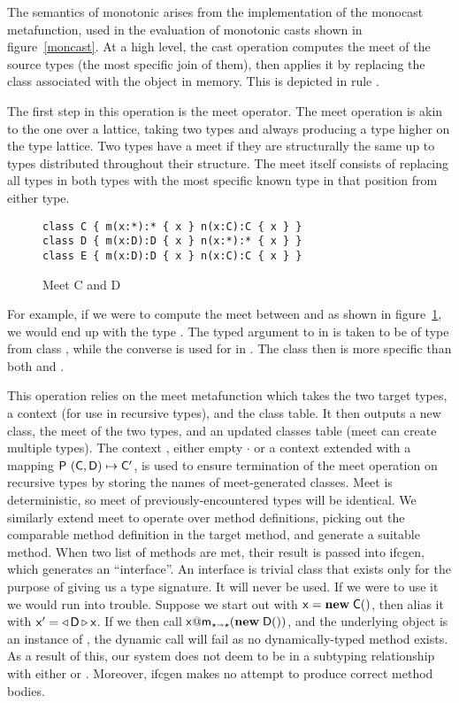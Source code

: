 \documentclass[sigconf]{acmart}
\begin{document}
The semantics of monotonic arises from the implementation of the monocast
metafunction, used in the evaluation of monotonic casts shown in
figure~\ref{moncast}. At a high level, the cast operation computes the
meet of the source types (the most specific join of them), then applies it
by replacing the class associated with the object in memory. This is depicted
in rule .

The first step in this operation is the meet operator. The meet operation is
akin to the one over a lattice, taking two types and always producing a type
higher on the type lattice. Two types have a meet if they are structurally
the same up to \any types distributed throughout their structure. The meet
itself consists of replacing all \any types in both types with the most
specific known type in that position from either type.

\begin{figure}[h]
\begin{lstlisting}
class C { m(x:*):* { x } n(x:C):C { x } }
class D { m(x:D):D { x } n(x:*):* { x } }
class E { m(x:D):D { x } n(x:C):C { x } }
\end{lstlisting}
\caption{Meet C and D}
\label{fig:meetex}
\end{figure}

\noindent
For example, if we were to compute the meet between \C and \D as  shown in
figure~\ref{fig:meetex}, we would end up with the type . The \any typed
argument to \m in \C is taken to be of type \D from class \D, while the
converse is used for \n in \D. The class  then is more specific than
both \C and \D.

This operation relies on the meet metafunction which takes the two target
types, a context (for use in recursive types), and the class table. It then
outputs a new class, the meet of the two types, and an updated classes table
(meet can create multiple types). The context , either empty $\cdot$
or a context extended with a mapping $\P ~{{(\C,\D)}\mapsto\Cp}$, is used to
ensure termination of the meet operation on recursive types by storing the
names of meet-generated classes. Meet is deterministic, so meet of
previously-encountered types will be identical. We similarly extend meet to
operate over method definitions, picking out the comparable method definition
in the target method, and generate a suitable method. When two list of
methods are met, their result is passed into ifcgen, which generates an
``interface''. An interface is trivial class that exists only for the
purpose of giving us a type signature.  It will never be used.  If we were
to use it we would run into trouble.  Suppose we start out with
$\x=\New\C{}$, then alias it with $\xp=\MonCast\D\x$. If we then call
$\DynCall\x\m{\New\D{}}$, and the underlying object is an instance of
, the dynamic call will fail as no dynamically-typed method exists. As
a result of this, our system does not deem  to be in a subtyping
relationship with either \C or \D. Moreover, ifcgen makes no attempt to
produce correct method bodies.
\end{document}
